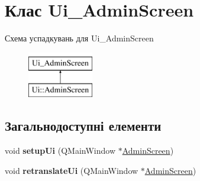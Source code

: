 \hypertarget{classUi__AdminScreen}{\section{Клас Ui\-\_\-\-Admin\-Screen}
\label{classUi__AdminScreen}
}
Схема успадкувань для Ui\-\_\-\-Admin\-Screen\begin{figure}[H]
\begin{center}
\leavevmode
\includegraphics[height=2.000000cm]{classUi__AdminScreen}
\end{center}
\end{figure}
\subsection*{Загальнодоступні елементи}
\begin{DoxyCompactItemize}
\item 
\hypertarget{classUi__AdminScreen_a0a67dc309a34eb0240dedbd00754fd7e}{void {\bfseries setup\-Ui} (Q\-Main\-Window $\ast$\hyperlink{classAdminScreen}{Admin\-Screen})}\label{classUi__AdminScreen_a0a67dc309a34eb0240dedbd00754fd7e}

\item 
\hypertarget{classUi__AdminScreen_aa6891d66f0e464aa293fd66b1330cc19}{void {\bfseries retranslate\-Ui} (Q\-Main\-Window $\ast$\hyperlink{classAdminScreen}{Admin\-Screen})}\label{classUi__AdminScreen_aa6891d66f0e464aa293fd66b1330cc19}

\end{DoxyCompactItemize}
